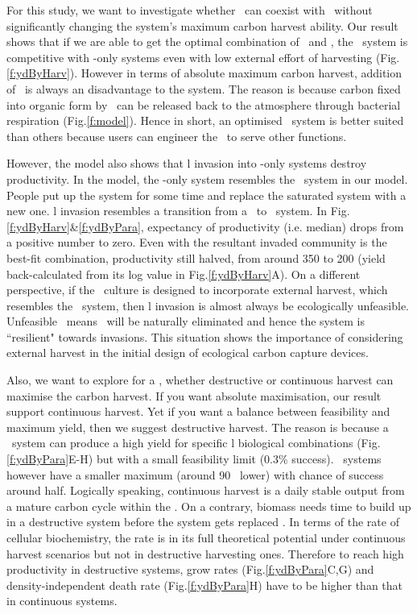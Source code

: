 \documentclass[../thesis.tex]{subfiles} %
\begin{document}
For this study, we want to investigate whether \bac\ can coexist with \phy\ without significantly changing the system’s maximum carbon harvest ability.  Our result shows that if we are able to get the optimal combination of \phy\ and \bac, the \PBH\ system is competitive with \phy-only systems even with low external effort of harvesting (Fig.\ref{f:ydByHarv}).  However in terms of absolute maximum carbon harvest, addition of \bac\ is always an disadvantage to the system.  The reason is because carbon fixed into organic form by \phy\ can be released back to the atmosphere through bacterial respiration (Fig.\ref{f:model}).  Hence in short, an optimised \PBH\ system is better suited than others because users can engineer the \bac\ to serve other functions.

However, the model also shows that \bac l invasion into \phy-only systems destroy productivity.  In the model, the \phy-only system resembles the \PoN\ system in our model.  People put up the system for some time and replace the saturated system with a new one.  \Bac l invasion resembles a transition from a \PoN\ to \PBN\ system.  In Fig.\ref{f:ydByHarv}\&\ref{f:ydByPara}, expectancy of productivity (i.e. median) drops from a positive number to zero.  Even with the resultant invaded community is the best-fit combination, productivity still halved, from around 350 to 200 \dxdt (yield back-calculated from its log value in Fig.\ref{f:ydByHarv}A).  On a different perspective, if the \phy\ culture is designed to incorporate external harvest, which resembles the \PoH\ system, then \bac l invasion is almost always be ecologically unfeasible.  Unfeasible \PBH\ means \bac\ will be naturally eliminated and hence the system is ``resilient" towards invasions.  This situation shows the importance of considering external harvest in the initial design of ecological carbon capture devices.

Also, we want to explore for a \pbs, whether destructive or continuous harvest can maximise the carbon harvest.  If you want absolute maximisation, our result support continuous harvest.  Yet if you want a balance between feasibility and maximum yield, then we suggest destructive harvest.  The reason is because a \PBH\ system can produce a high yield for specific \bac l biological combinations (Fig.\ref{f:ydByPara}E-H) but with a small feasibility limit (0.3\% success).  \PBN\ systems however have a smaller maximum (around 90 \dxdt\ lower) with chance of success around half.  Logically speaking, continuous harvest is a daily stable output from a mature carbon cycle within the \pbs.  On a contrary, biomass needs time to build up in a destructive system before the system gets replaced \autocite{aytekin2016statistical}.  In terms of the rate of cellular biochemistry, the rate is in its full theoretical potential under continuous harvest scenarios but not in destructive harvesting ones.  Therefore to reach high productivity in destructive systems, grow rates (Fig.\ref{f:ydByPara}C,G) and density-independent death rate (Fig.\ref{f:ydByPara}H) have to be higher than that in continuous systems.
\end{document}
